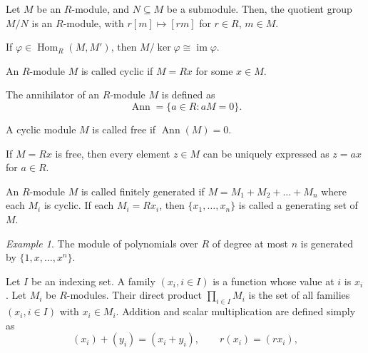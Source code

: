 \documentclass[11pt]{article}
\DeclareMathOperator{\im}{im}
\DeclareMathOperator{\Hom}{Hom}
\DeclareMathOperator{\Ann}{Ann}
\theoremstyle{definition}
\theoremstyle{remark}
\newtheorem*{example}{Example}
\numberwithin{equation}{section}
\begin{document}
    \begin{theorem}
        Let $M$ be an $R$-module, and $N\subseteq M$ be a submodule. Then, the
        quotient group $M/N$ is an $R$-module, with $r[m] \mapsto [rm]$ for $r \in
        R$, $m \in M$.
    \end{theorem}

    \begin{theorem}
        If $\varphi \in \Hom_R(M, M')$, then $M/\ker\varphi \cong \im\varphi$.
    \end{theorem}


    \begin{definition}
        An $R$-module $M$ is called cyclic if $M = Rx$ for some $x \in M$.
    \end{definition}

    \begin{definition}
        The annihilator of an $R$-module $M$ is defined as \[
            \Ann = \{a \in R : aM = 0\}.
        \] 
    \end{definition}
    \begin{definition}
        A cyclic module $M$ is called free if $\Ann(M) = 0$.
    \end{definition}
    \begin{lemma}
        If $M = Rx$ is free, then every element $z \in M$ can be uniquely expressed
        as $z = ax$ for $a \in R$.
    \end{lemma}

    \begin{definition}
        An $R$-module $M$ is called finitely generated if $M = M_1 + M_2 + \dots +
        M_n$ where each $M_i$ is cyclic. If each $M_i = Rx_i$, then $\{x_1, \dots,
        x_n\}$ is called a generating set of $M$.
    \end{definition}
    \begin{example}
        The module of polynomials over $R$ of degree at most $n$ is generated by
        $\{1, x, \dots, x^n\}$.
    \end{example}


    \begin{definition}
        Let $I$ be an indexing set. A family $(x_i, i \in I)$ is a function whose
        value at $i$ is $x_i$. Let $M_i$ be $R$-modules. Their direct product
        $\prod_{i \in I} M_i$ is the set of all families $(x_i, i \in I)$ with $x_i
        \in M_i$. Addition and scalar multiplication are defined simply as \[
            (x_i) + (y_i) = (x_i + y_i), \qquad r(x_i) = (rx_i),
        \] 
    \end{definition}
\end{document}
